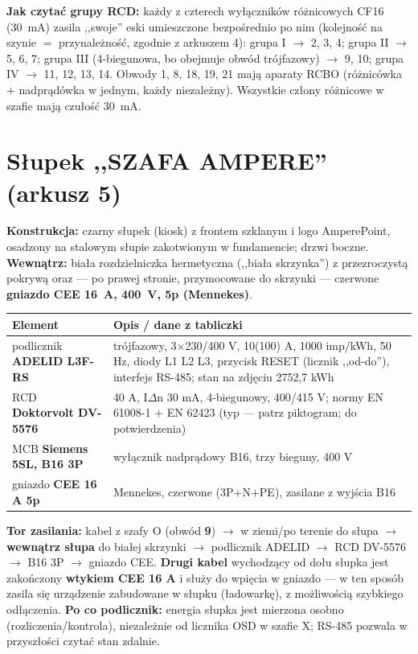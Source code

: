 \documentclass[11pt,a4paper]{article}
\begin{document}
\textbf{Jak czytać grupy RCD:} każdy z czterech wyłączników różnicowych CF16 (30~mA) zasila
,,swoje'' eski umieszczone bezpośrednio po nim (kolejność na szynie $=$ przynależność, zgodnie
z arkuszem 4): grupa I $\to$ 2, 3, 4; grupa II $\to$ 5, 6, 7; grupa III (4-biegunowa, bo obejmuje
obwód trójfazowy) $\to$ 9, 10; grupa IV $\to$ 11, 12, 13, 14. Obwody 1, 8, 18, 19, 21 mają
aparaty RCBO (różnicówka $+$ nadprądówka w jednym, każdy niezależny). Wszystkie człony różnicowe
w szafie mają czułość 30~mA.

\section{Słupek ,,SZAFA AMPERE'' (arkusz 5)}
\textbf{Konstrukcja:} czarny słupek (kiosk) z frontem szklanym i logo AmperePoint, osadzony na
stalowym słupie zakotwionym w fundamencie; drzwi boczne. \textbf{Wewnątrz:} biała rozdzielniczka
hermetyczna (,,biała skrzynka'') z przezroczystą pokrywą oraz --- po prawej stronie, przymocowane
do skrzynki --- czerwone \textbf{gniazdo CEE 16~A, 400~V, 5p (Mennekes)}.
\begin{longtable}{@{}p{}p{}@{}}
\toprule
\textbf{Element} & \textbf{Opis / dane z tabliczki}\\
\midrule
podlicznik \textbf{ADELID L3F-RS} & trójfazowy, 3$\times$230/400 V, 10(100) A, 1000 imp/kWh,
50 Hz, diody L1 L2 L3, przycisk RESET (licznik ,,od-do''), interfejs RS-485; stan na zdjęciu
2752,7 kWh\\
RCD \textbf{Doktorvolt DV-5576} & 40 A, I$\Delta$n 30 mA, 4-biegunowy, 400/415 V; normy
EN 61008-1 $+$ EN 62423 (typ --- patrz piktogram; do potwierdzenia)\\
MCB \textbf{Siemens 5SL, B16 3P} & wyłącznik nadprądowy B16, trzy bieguny, 400 V\\
gniazdo \textbf{CEE 16 A 5p} & Mennekes, czerwone (3P$+$N$+$PE), zasilane z wyjścia B16\\
\bottomrule
\end{longtable}
\textbf{Tor zasilania:} kabel z szafy O (obwód \textbf{9}) $\to$ w ziemi/po terenie do słupa $\to$
\textbf{wewnątrz słupa} do białej skrzynki $\to$ podlicznik ADELID $\to$ RCD DV-5576 $\to$ B16 3P
$\to$ gniazdo CEE. \textbf{Drugi kabel} wychodzący od dołu słupka jest zakończony \textbf{wtykiem
CEE 16 A} i służy do wpięcia w gniazdo --- w ten sposób zasila się urządzenie zabudowane
w słupku (ładowarkę), z możliwością szybkiego odłączenia. \textbf{Po co podlicznik:} energia
słupka jest mierzona osobno (rozliczenia/kontrola), niezależnie od licznika OSD w szafie X;
RS-485 pozwala w przyszłości czytać stan zdalnie.
\end{document}
